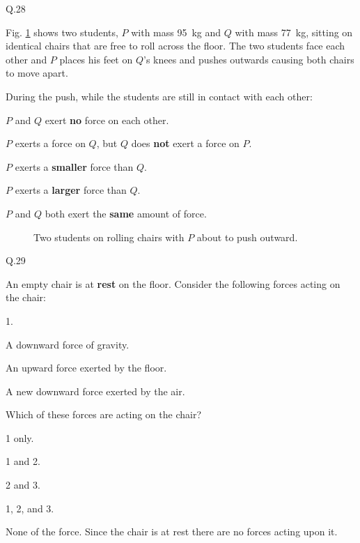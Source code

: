    \begin{mcq}{Q.28}{Fig. \ref{fig:chairs} shows two students, $P$ with mass \SI{95}{\kg} and $Q$ with mass \SI{77}{\kg}, sitting on identical chairs that are free to roll across the floor. The two students face each other and $P$ places his feet on $Q$'s knees and pushes outwards causing both chairs to move apart.

            \eline[]
            During the push, while the students are still in contact with each other:
    }
        \item $P$ and $Q$ exert \textbf{no} force on each other.
        \item $P$ exerts a force on $Q$, but $Q$ does \textbf{not} exert a force on $P$.
        \item $P$ exerts a \textbf{smaller} force than $Q$.
        \item $P$ exerts a \textbf{larger} force than $Q$.
        \item $P$ and $Q$ both exert the \textbf{same} amount of force.
    \end{mcq}

    \begin{figure}[h!]
        \begin{center}
            
            \caption{\label{fig:chairs} Two students on rolling chairs with $P$ about to push outward.}
        \end{center}
    \end{figure}


    \begin{mcq}{Q.29}{An empty chair is at \textbf{rest} on the floor. Consider the following forces acting on the chair:

        \eline[]
        \begin{options}{1.}
            \item A downward force of gravity.
            \item An upward force exerted by the floor.
            \item A new downward force exerted by the air.
        \end{options}
        \eline[]

        Which of these forces are acting on the chair?
    }
        \item 1 only.
        \item 1 and 2.
        \item 2 and 3.
        \item 1, 2, and 3.
        \item None of the force. Since the chair is at rest there are no forces acting upon it.
    \end{mcq}

